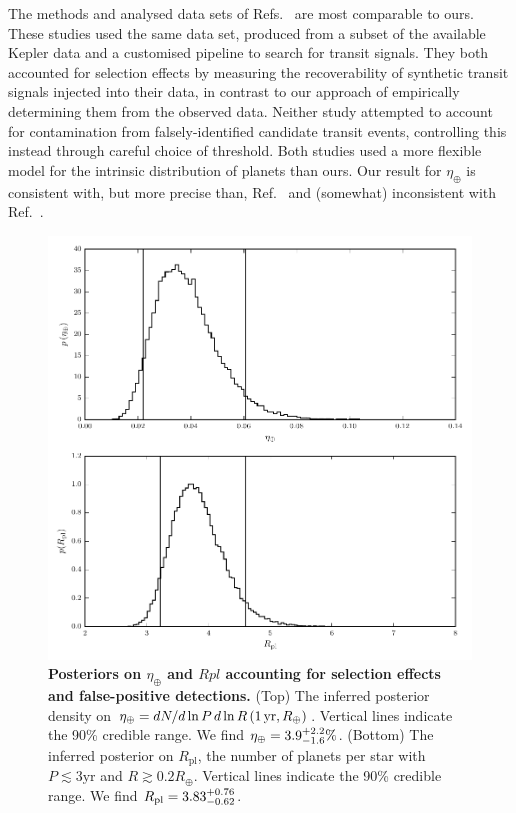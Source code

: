 \documentclass{nature}
\newcommand{\etaearth}{\eta_\oplus}
\newcommand{\REarth}{R_\oplus}
\newcommand{\Rpl}{R_\mathrm{pl}}
\begin{document}
The methods and analysed data sets of
Refs.\ \cite{Petigura2013,Foreman-Mackey2014} are most comparable to
ours.  These studies used the same data set,
produced\cite{Petigura2013} from a subset of the available Kepler data
and a customised pipeline to search for transit signals.  They both
accounted for selection effects by measuring the recoverability of
synthetic transit signals injected into their data, in contrast to our
approach of empirically determining them from the observed data.
Neither study attempted to account for contamination from
falsely-identified candidate transit events, controlling this instead
through careful choice of threshold.  Both studies used a more
flexible model for the intrinsic distribution of planets than ours.
Our result for $\etaearth$ is consistent with, but more precise than,
Ref.\ \cite{Foreman-Mackey2014} and (somewhat) inconsistent with
Ref.\ \cite{Petigura2013}.  


\begin{figure}
  \includegraphics[width=\columnwidth]{pars}
  \caption{\label{fig:eta-earth} \textbf{Posteriors on $\etaearth$ and
      $Rpl$ accounting for selection effects and false-positive
      detections.}  (Top) The inferred posterior density on $\etaearth
    = dN/d\ln P \, d\ln R \left( 1\, \textnormal{yr}, R_\oplus
    \right)$.  Vertical lines indicate the 90\% credible range.  We
    find $\etaearth = \earange$.  (Bottom) The inferred posterior on
    $\Rpl$, the number of planets per star with $P \lesssim 3
    \mathrm{yr}$ and $R \gtrsim 0.2 \REarth$.  Vertical lines indicate
    the 90\% credible range.  We find $\Rpl = \rplrange$.}
\end{figure}
\end{document}
